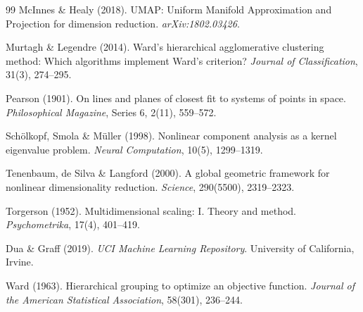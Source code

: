 \documentclass[12pt,a4paper]{report}
\begin{document}
\begin{thebibliography}{99}
McInnes \& Healy (2018).
UMAP: Uniform Manifold Approximation and Projection for dimension
reduction.
\textit{arXiv:1802.03426}.

Murtagh \& Legendre (2014).
Ward's hierarchical agglomerative clustering method: Which algorithms
implement Ward's criterion?
\textit{Journal of Classification}, 31(3), 274--295.

Pearson (1901).
On lines and planes of closest fit to systems of points in space.
\textit{Philosophical Magazine}, Series 6, 2(11), 559--572.

Schölkopf, Smola \& Müller (1998).
Nonlinear component analysis as a kernel eigenvalue problem.
\textit{Neural Computation}, 10(5), 1299--1319.

Tenenbaum, de Silva \& Langford (2000).
A global geometric framework for nonlinear dimensionality reduction.
\textit{Science}, 290(5500), 2319--2323.

Torgerson (1952).
Multidimensional scaling: I. Theory and method.
\textit{Psychometrika}, 17(4), 401--419.

Dua \& Graff (2019).
\textit{UCI Machine Learning Repository}.
University of California, Irvine.

Ward (1963).
Hierarchical grouping to optimize an objective function.
\textit{Journal of the American Statistical Association}, 58(301), 236--244.

\end{thebibliography}
\end{document}
